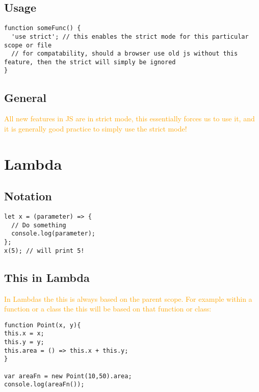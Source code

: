 \documentclass[main.tex,fontsize=6pt,paper=a4,paper=landscape,DIV=calc,]{scrartcl}
\begin{document}
\begin{multicols*}{4}
\subsection{Usage}  
\vspace{-2mm}
\begin{lstlisting}
function someFunc() {
  'use strict'; // this enables the strict mode for this particular scope or file
  // for compatability, should a browser use old js without this feature, then the strict will simply be ignored
}
\end{lstlisting}
\vspace{2mm}

\subsection{General}  
\textcolor{orange}{All new features in JS are in strict mode, this essentially forces us to use it, and it is generally good practice to simply use the strict mode!}

\section{Lambda}

\subsection{Notation}  
\vspace{-2mm}
\begin{lstlisting}
let x = (parameter) => {
  // Do something
  console.log(parameter);
};
x(5); // will print 5!
\end{lstlisting}
\vspace{2mm}

\subsection{This in Lambda} 
\textcolor{orange}{In Lambdas the this is always based on the parent scope.\newline
For example within a function or a class the this will be based on that function or class:}\newline
\vspace{-2mm}
\begin{lstlisting}
function Point(x, y){
this.x = x;
this.y = y;
this.area = () => this.x + this.y;
}

var areaFn = new Point(10,50).area;
console.log(areaFn());


\end{lstlisting}
\end{multicols*}
\end{document}
